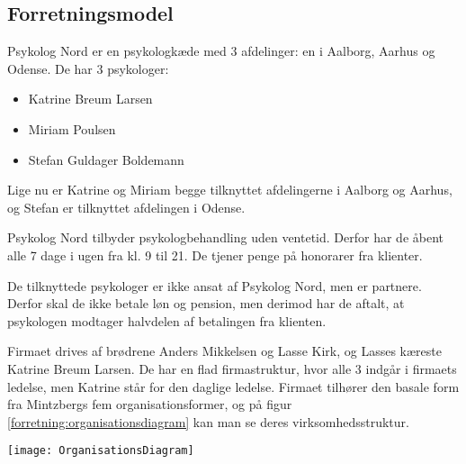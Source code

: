 \subsection{Forretningsmodel}
Psykolog Nord er en psykologkæde med 3 afdelinger: en i Aalborg, Aarhus og Odense. De har 3 psykologer:

\begin{itemize}
    \item Katrine Breum Larsen
    \item Miriam Poulsen
    \item Stefan Guldager Boldemann
\end{itemize}

Lige nu er Katrine og Miriam begge tilknyttet afdelingerne i Aalborg og Aarhus, og Stefan er tilknyttet afdelingen i Odense.

Psykolog Nord tilbyder psykologbehandling uden ventetid.
Derfor har de åbent alle 7 dage i ugen fra kl. 9 til 21. De tjener penge på honorarer fra klienter.

De tilknyttede psykologer er ikke ansat af Psykolog Nord, men er partnere.
Derfor skal de ikke betale løn og pension, men derimod har de aftalt, at psykologen modtager halvdelen af betalingen fra klienten.

Firmaet drives af brødrene Anders Mikkelsen og Lasse Kirk, og Lasses kæreste Katrine Breum Larsen.
De har en flad firmastruktur, hvor alle 3 indgår i firmaets ledelse, men Katrine står for den daglige ledelse. 
Firmaet tilhører den basale form fra Mintzbergs fem organisationsformer, og på figur \ref{forretning:organisationsdiagram} kan man se deres virksomhedsstruktur.

\texttt{[image: OrganisationsDiagram]}\label{forretning:organisationsdiagram}